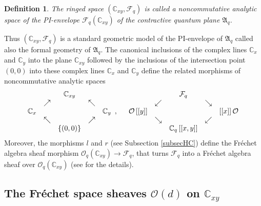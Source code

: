 \documentclass[12pt,reqno]{amsart}%
\theoremstyle{plain}
\newtheorem{definition}{Definition}
\numberwithin{theorem}{section} \numberwithin{equation}{section}
\numberwithin{lemma}{section}
\numberwithin{remark}{section}
\numberwithin{example}{section}
\numberwithin{proposition}{section}
\numberwithin{definition}{section}
\numberwithin{corollary}{section}
\begin{document}
\begin{definition}
\label{def3}The ringed space $\left(  \mathbb{C}_{xy},\mathcal{F}_{q}\right)
$ is called a noncommutative analytic space of the PI-envelope $\mathcal{F}%
_{q}\left(  \mathbb{C}_{xy}\right)  $ of the contractive quantum plane
$\mathfrak{A}_{q}$.
\end{definition}

Thus $\left(  \mathbb{C}_{xy},\mathcal{F}_{q}\right)  $ is a standard
geometric model of the PI-envelope of $\mathfrak{A}_{q}$ called also the
formal geometry of $\mathfrak{A}_{q}$. The canonical inclusions of the complex
lines $\mathbb{C}_{x}$ and $\mathbb{C}_{y}$ into the plane $\mathbb{C}_{xy}$
followed by the inclusions of the intersection point $\left(  0,0\right)  $
into these complex lines $\mathbb{C}_{x}$ and $\mathbb{C}_{y}$ define the
related morphisms of noncommutative analytic spaces%
\[%
\begin{array}
[c]{ccccc}
&  & \mathbb{C}_{xy} &  & \\
& \nearrow &  & \nwarrow & \\
\mathbb{C}_{x} &  &  &  & \mathbb{C}_{y}\\
& \nwarrow &  & \nearrow & \\
&  & \left\{  \left(  0,0\right)  \right\}  &  &
\end{array}
,\quad%
\begin{array}
[c]{ccccc}
&  & \mathcal{F}_{q} &  & \\
& \swarrow &  & \searrow & \\
\mathcal{O}\left[  \left[  y\right]  \right]  &  &  &  & \left[  \left[
x\right]  \right]  \mathcal{O}\\
& \searrow &  & \swarrow & \\
&  & \mathbb{C}_{q}\left[  \left[  x,y\right]  \right]  &  &
\end{array}
\]
Moreover, the morphisms $l$ and $r$ (see Subsection \ref{subsecHC}) define the
Fr\'{e}chet algebra sheaf morphism $\mathcal{O}_{q}\left(  \mathbb{C}%
_{xy}\right)  \rightarrow\mathcal{F}_{q}$, that turns $\mathcal{F}_{q}$ into a
Fr\'{e}chet algebra sheaf over $\mathcal{O}_{q}\left(  \mathbb{C}_{xy}\right)
$ (see \cite{Dosi25} for the details).

\subsection{The Fr\'{e}chet space sheaves $\mathcal{O}\left(  d\right)  $ on
$\mathbb{C}_{xy}$\label{subsecOQ}}
\end{document}
